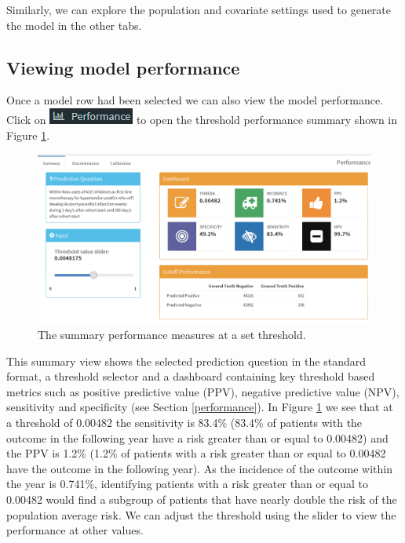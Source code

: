 \documentclass[11pt]{book}
\theoremstyle{definition}
\theoremstyle{definition}
\theoremstyle{definition}
\theoremstyle{remark}
\begin{document}
Similarly, we can explore the population and covariate settings used to generate the model in the other tabs.

\hypertarget{viewing-model-performance}{%
\subsection{Viewing model performance}\label{viewing-model-performance}}

Once a model row had been selected we can also view the model performance. Click on \includegraphics{images/PatientLevelPrediction/performance.png} to open the threshold performance summary shown in Figure \ref{fig:shinyPerformanceSum}.

\begin{figure}

{\centering \includegraphics[width=1\linewidth]{images/PatientLevelPrediction/shiny/shinyPerformanceSum} 

}

\caption{The summary performance measures at a set threshold.}\label{fig:shinyPerformanceSum}
\end{figure}

This summary view shows the selected prediction question in the standard format, a threshold selector and a dashboard containing key threshold based metrics such as positive predictive value (PPV), negative predictive value (NPV), sensitivity and specificity (see Section \ref{performance}). In Figure \ref{fig:shinyPerformanceSum} we see that at a threshold of 0.00482 the sensitivity is 83.4\% (83.4\% of patients with the outcome in the following year have a risk greater than or equal to 0.00482) and the PPV is 1.2\% (1.2\% of patients with a risk greater than or equal to 0.00482 have the outcome in the following year). As the incidence of the outcome within the year is 0.741\%, identifying patients with a risk greater than or equal to 0.00482 would find a subgroup of patients that have nearly double the risk of the population average risk. We can adjust the threshold using the slider to view the performance at other values.
\end{document}
